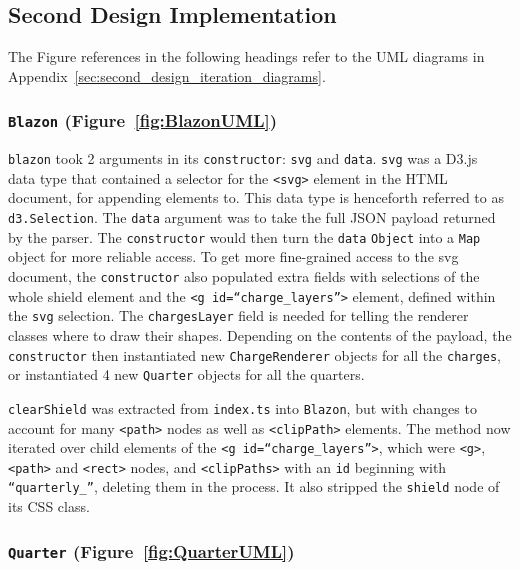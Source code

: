 \documentclass[nobib, a4paper, twoside, justified]{tufte-book}
\makeatletter
\newcommand{\svg}{\gls{svg}\@\xspace}
\newcommand{\charges}{\glspl{charge}\@\xspace}
\newcommand{\quarters}{\glspl{quarter}\@\xspace}
\newcommand{\ublazon}{\Gls{blazon}\@\xspace}
\newcommand{\payload}{\gls{payload}\@\xspace}
\makeatother
\begin{document}
\subsection{Second Design Implementation}%
\label{sub:second_design_implementation}

The Figure references in the following headings refer to the UML diagrams in
Appendix~\ref{sec:second_design_iteration_diagrams}.

\subsubsection{\texttt{Blazon} (Figure~\ref{fig:BlazonUML})}%
\label{ssub:blazon}

\texttt{\ublazon} took 2 arguments in its \texttt{constructor}: \texttt{svg} and \texttt{data}.
\texttt{svg} was a D3.js~\autocite{d3js} data type that contained a selector for the \texttt{<svg>}
element in the HTML document, for appending elements to. This data type is henceforth referred to
as \texttt{d3.Selection}. The \texttt{data} argument was to take the full JSON \payload returned by
the parser. The \texttt{constructor} would then turn the \texttt{data} \texttt{Object} into a
\texttt{Map} object for more reliable access. To get more fine-grained access to the \svg document,
the \texttt{constructor} also populated extra fields with selections of the whole shield element
and the \texttt{<g id=``charge\_layers''>} element, defined within the \texttt{svg} selection. The
\texttt{chargesLayer} field is needed for telling the renderer classes where to draw their shapes.
Depending on the contents of the \payload, the \texttt{constructor} then instantiated new
\texttt{ChargeRenderer} objects for all the \texttt{\charges}, or instantiated 4 new
\texttt{Quarter} objects for all the \quarters.

\texttt{clearShield} was extracted from \texttt{index.ts} into \texttt{Blazon}, but with changes to
account for many \texttt{<path>} nodes as well as \texttt{<clipPath>} elements. The method now
iterated over child elements of the \texttt{<g id=``charge\_layers''>}, which were \texttt{<g>},
\texttt{<path>} and \texttt{<rect>} nodes, and \texttt{<clipPaths>} with an \texttt{id} beginning
with \texttt{``quarterly\_''}, deleting them in the process. It also stripped the \texttt{shield}
node of its CSS class.

\subsubsection{\texttt{Quarter} (Figure~\ref{fig:QuarterUML})}%
\label{ssub:quarter}
\end{document}

